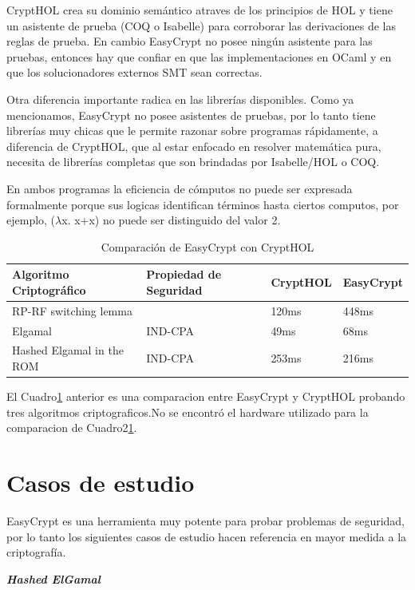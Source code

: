 \documentclass[runningheads,a4paper]{llncs}
\begin{document}
CryptHOL crea su dominio semántico atraves de los principios de HOL y tiene un asistente de prueba (COQ o Isabelle) para corroborar las derivaciones de las reglas de prueba. En cambio EasyCrypt no posee ningún asistente para las pruebas, entonces hay que confiar en que las implementaciones en OCaml y en que los solucionadores externos SMT sean correctas.

Otra diferencia importante radica en las librerías disponibles. Como ya mencionamos, EasyCrypt no posee asistentes de pruebas, por lo tanto tiene librerías muy chicas que le permite razonar sobre programas rápidamente, a diferencia de CryptHOL, que al estar enfocado en resolver matemática pura, necesita de librerías completas que son brindadas por Isabelle/HOL o COQ.

En ambos programas la eficiencia de cómputos no puede ser expresada formalmente porque sus logicas identifican términos hasta ciertos computos, por ejemplo, ($\lambda$x. x+x) no puede ser distinguido del valor 2.\cite{article6}

\begin{table}
  \caption{Comparación de EasyCrypt con CryptHOL}
  \label{tab:simple2}
  \centering
  \begin{tabular}{ |p{4cm}|p{3.5cm}|p{2cm}|p{2cm}|  }
 \hline
 Algoritmo Criptográfico & Propiedad de Seguridad & CryptHOL & EasyCrypt\\\cline{1-4}
 \hline
 RP-RF switching lemma &  & 120ms & 448ms\\
 Elgamal & IND-CPA & 49ms  & 68ms\\
 Hashed Elgamal in the ROM & IND-CPA & 253ms &  216ms\\
 \hline
\end{tabular}
\end{table}


El Cuadro\ref{tab:simple2} anterior es una comparacion entre EasyCrypt y CryptHOL probando tres algoritmos criptograficos.No se encontró el hardware utilizado para la comparacion de Cuadro2\ref{tab:simple2}.




\section{Casos de estudio}
EasyCrypt es una herramienta muy potente para probar problemas de seguridad, por lo tanto los siguientes casos de estudio hacen referencia en mayor medida a la criptografía.


\centerline{\textbf{{\emph{Hashed ElGamal}}}}
\end{document}
